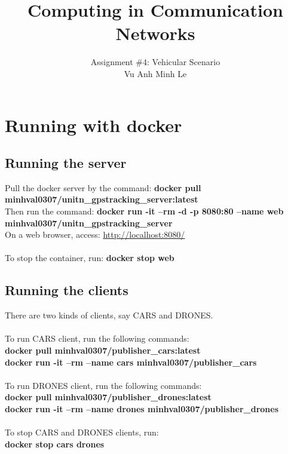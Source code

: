 \documentclass{article}
\begin{document}

\title{Computing in Communication Networks} %
\author{Assignment \#4: Vehicular Scenario\\Vu Anh Minh Le} %

\maketitle


\section{Running with docker}
\subsection{Running the server}
Pull the docker server by the command: \textbf{docker pull minhval0307/unitn\_gpstracking\_server:latest}
\\
Then run the command: \textbf{docker run -it --rm -d -p 8080:80 --name web minhval0307/unitn\_gpstracking\_server}
\\
On a web browser, access: \href{http://localhost:8080/}{http://localhost:8080/}
\\~\\
To stop the container, run: \textbf{docker stop web}
\subsection{Running the clients}
There are two kinds of clients, say CARS and DRONES.\\~\\
To run CARS client, run the following commands:\\
\textbf{docker pull minhval0307/publisher\_cars:latest}\\
\textbf{docker run -it --rm --name cars minhval0307/publisher\_cars}
\\~\\
To run DRONES client, run the following commands:\\
\textbf{docker pull minhval0307/publisher\_drones:latest}\\
\textbf{docker run -it --rm --name drones minhval0307/publisher\_drones}
\\~\\
To stop CARS and DRONES clients, run:\\
\textbf{docker stop cars drones}
\end{document}
